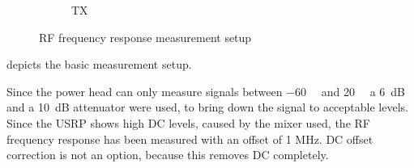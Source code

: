\documentclass[12pt,a4paper,parskip=full]{scrartcl}
\begin{document}
\begin{figure}[htb]
\begin{subfigure}[t]{.5\linewidth}
{
        }
        \caption{TX}
    \end{subfigure}
    \caption{RF frequency response measurement setup}
    \label{fig:rfsetup}
\end{figure}
 depicts the basic measurement setup.

Since the power head can only measure signals between \SI{-60}{\deci\belm} and
\SI{20}{\deci\belm} a \SI{6}{\deci\bel} and a \SI{10}{\deci\bel} attenuator were used,
to bring down the signal to acceptable levels. Since the USRP shows high DC levels,
caused by the mixer used, the RF frequency response has been measured with an offset
of 1 MHz. DC offset correction is not an option, because this removes DC completely.
\end{document}
